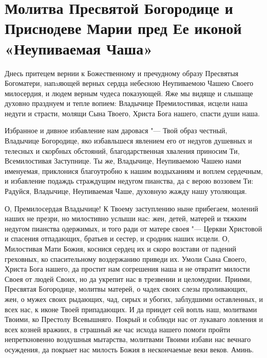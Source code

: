 \begin{mymulticols}
\end{mymulticols}

\mychapterending


\section{Молитва Пресвятой Богородице и Приснодеве Марии пред  Ее иконой «Неупиваемая Чаша»}\begin{mymulticols}


Днесь притецем вернии к Божественному и пречудному образу Пресвятыя Богоматери, напaяющей верных сердца небесною Неупиваемою Чашею Своего милосердия, и людем верным чудеса показующей. Яже мы видяще и слышаще духовно празднуем и тепле вопием: Владычице Премилостивая, исцели наша недуги и страсти, молящи Сына Твоего, Христа Бога нашего, спасти души наша.


Избранное и дивное избавление нам даровася "--- Твой образ честный, Владычице Богородице, яко избавльшеся явлением его от недугов душевных и телесных и скорбных обстояний, благодарственная хваления приносим Ти, Всемилостивая Заступнице. Ты же, Владычице, Неупиваемою Чашею нами именуемая, приклонися благоутробно к нашим воздыханиям и воплем сердечным, и избавление подаждь страждущим недугом пианства, да с верою воззовем Ти: Радуйся, Владычице, Неупиваемая Чаше, духовную жажду нашу утоляющая.


О, Премилосердая Владычице! К Твоему заступлению ныне прибегаем, молений наших не презри, но милостивно услыши нас: жен, детей, матерей и тяжким недугом пианства одержимых, и того ради от матере своея "--- Церкви Христовой и спасения отпадающих, братьев и сестер, и сродник наших исцели. О, Милостивая Мати Божия, коснися сердец их и скоро возстави от падений греховных, ко спасительному воздержанию приведи их. Умоли Сына Своего, Христа Бога нашего, да простит нам согрешения наша и не отвратит милости Своея от людей Своих, но да укрепит нас в трезвении и целомудрии. Приими, Пресвятая Богородице, молитвы матерей, о чадех своих слезы проливающих, жен, о мужех своих рыдающих, чад, сирых и убогих, заблудшими оставленных, и всех нас, к иконе Твоей припадающих. И да приидет сей вопль наш, молитвами Твоими, ко Престолу Всевышняго. Покрый и соблюди нас от лукаваго ловления и всех козней вражиих, в страшный же час исхода нашего помоги пройти непреткновенно воздушныя мытарства, молитвами Твоими избави нас вечнаго осуждения, да покрыет нас милость Божия в нескончаемые веки веков. Аминь.

\end{mymulticols}

